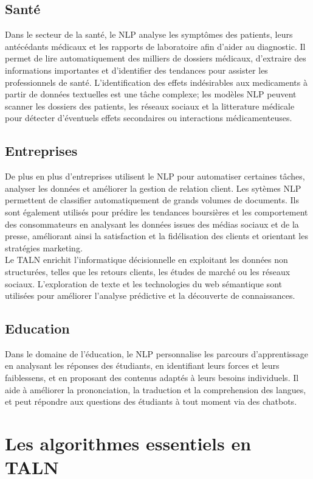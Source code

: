 \documentclass[12pt,a4paper]{report}
\begin{document}
	\subsection{Santé}
	Dans le secteur de la santé, le NLP analyse les symptômes des patients, leurs antécédants médicaux et les rapports de laboratoire afin d'aider au diagnostic. Il permet de lire automatiquement des milliers de dossiers médicaux, d'extraire des informations importantes et d'identifier des tendances pour assister les professionnels de santé. L'identification des effets indésirables aux medicaments à partir de données textuelles est une tâche complexe; les modèles NLP peuvent scanner les dossiers des patients, les réseaux sociaux et la litterature médicale pour détecter d'éventuels effets secondaires ou interactions médicamenteuses.\cite{sante}
	\subsection{Entreprises}
	De plus en plus d'entreprises utilisent le NLP pour automatiser certaines tâches, analyser les données et améliorer la gestion de relation client. Les sytèmes NLP permettent de classifier automatiquement de grands volumes de documents. Ils sont également utilisés pour prédire les tendances boursières et les comportement des consommateurs en analysant les données issues des médias sociaux et de la presse, améliorant ainsi la satisfaction et la fidélisation des clients et orientant les stratégies marketing.\\
	Le TALN enrichit l'informatique décisionnelle en exploitant les données non structurées, telles que les retours clients, les études de marché ou les réseaux sociaux. L'exploration de texte et les technologies du web sémantique sont utilisées pour améliorer l'analyse prédictive et la découverte de connaissances.\cite{entreprise}
	\subsection{Education}
	Dans le domaine de l'éducation, le NLP personnalise les parcours d'apprentissage en analysant les réponses des étudiants, en identifiant leurs forces et leurs faiblessens, et en proposant des contenus adaptés à leurs besoins individuels. Il aide à améliorer la prononciation, la traduction et la comprehension des langues, et peut répondre aux questions des étudiants à tout moment via des chatbots. \cite{education}
	\section{Les algorithmes essentiels en TALN}
\end{document}
